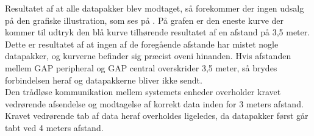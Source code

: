Resultatet af at alle datapakker blev modtaget, så forekommer der ingen udsalg på den grafiske illustration, som ses på . På grafen er den eneste kurve der kommer til udtryk den blå kurve tilhørende resultatet af en afstand på 3,5 meter. Dette er resultatet af at ingen af de foregående afstande har mistet nogle datapakker, og kurverne befinder sig præcist oveni hinanden. Hvis afstanden mellem GAP peripheral og GAP central overskrider 3,5 meter, så brydes forbindelsen heraf og datapakkerne bliver ikke sendt. \\
Den trådløse kommunikation mellem systemets enheder overholder kravet vedrørende afsendelse og modtagelse af korrekt data inden for 3 meters afstand. Kravet vedrørende tab af data heraf overholdes ligeledes, da datapakker først går tabt ved 4 meters afstand. 
